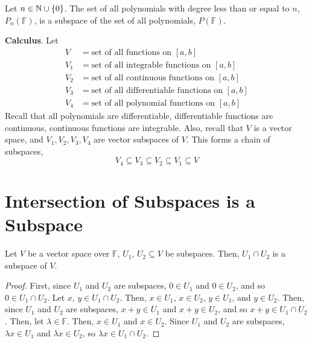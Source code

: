 \documentclass[letterpaper,12pt]{article}
\begin{document}
\begin{example}
Let $n \in \mathbb{N} \cup \left\{ 0 \right\}$. The set of all polynomials with degree less than or equal to $n$, $P_{n}(\mathbb{F})$, is a subspace of the set of all polynomials, $P(\mathbb{F})$.
\end{example}

\begin{example}
\textbf{Calculus}. Let
\begin{align*}
    V & = \text{set of all functions on $[a,b]$} \\
    V_1 & = \text{set of all integrable functions on $[a,b]$} \\
    V_2 & = \text{set of all continuous functions on $[a,b]$} \\
    V_3 & = \text{set of all differentiable functions on $[a,b]$} \\
    V_4 & = \text{set of all polynomial functions on $[a,b]$}
\end{align*}
Recall that all polynomials are differentiable, differentiable functions are continuous, continuous functions are integrable. Also, recall that $V$ is a vector space, and $V_1, V_2, V_3, V_4$ are vector subspaces of $V$. This forms a chain of subspaces,
\begin{equation*}
    V_4 \subseteq V_3 \subseteq V_2 \subseteq V_1 \subseteq V
\end{equation*}
\end{example}


\section*{Intersection of Subspaces is a Subspace}
\begin{theorem}
Let $V$ be a vector space over $\mathbb{F}$, $U_1$, $U_2 \subseteq V$ be subspaces. Then, $U_1 \cap U_2$ is a subspace of $V$.
\end{theorem}
\begin{proof}
First, since $U_1$ and $U_2$ are subspaces, $0 \in U_1$ and $0 \in U_2$, and so $0 \in U_1 \cap U_2$. Let $x$, $y \in U_1 \cap U_2$. Then, $x \in U_1$, $x \in U_2$, $y \in U_1$, and $y \in U_2$. Then, since $U_1$ and $U_2$ are subspaces, $x + y \in U_1$ and $x + y \in U_2$, and so $x + y \in U_1 \cap U_2$. Then, let $\lambda \in \mathbb{F}$. Then, $x \in U_1$ and $x \in U_2$. Since $U_1$ and $U_2$ are subspaces, $\lambda x \in U_1$ and $\lambda x \in U_2$, so $\lambda x \in U_1 \cap U_2$.
\end{proof}
\end{document}
